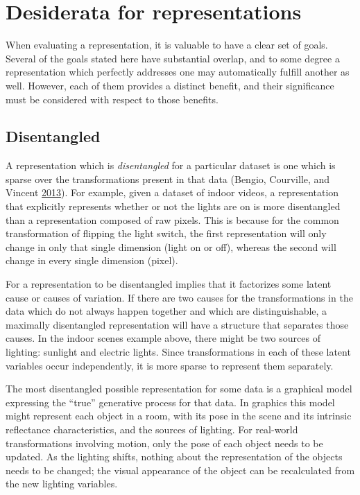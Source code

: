 \documentclass[12pt,twoside]{mitthesis}
\begin{document}
\chapter{Desiderata for
representations}\label{desiderata-for-representations}

When evaluating a representation, it is valuable to have a clear set of
goals. Several of the goals stated here have substantial overlap, and to
some degree a representation which perfectly addresses one may
automatically fulfill another as well. However, each of them provides a
distinct benefit, and their significance must be considered with respect
to those benefits.

\section{Disentangled}\label{disentangled}

A representation which is \emph{disentangled} for a particular dataset
is one which is sparse over the transformations present in that data
(Bengio, Courville, and Vincent
\protect\hyperlink{ref-bengio2013representation}{2013}). For example,
given a dataset of indoor videos, a representation that explicitly
represents whether or not the lights are on is more disentangled than a
representation composed of raw pixels. This is because for the common
transformation of flipping the light switch, the first representation
will only change in only that single dimension (light on or off),
whereas the second will change in every single dimension (pixel).

For a representation to be disentangled implies that it factorizes some
latent cause or causes of variation. If there are two causes for the
transformations in the data which do not always happen together and
which are distinguishable, a maximally disentangled representation will
have a structure that separates those causes. In the indoor scenes
example above, there might be two sources of lighting: sunlight and
electric lights. Since transformations in each of these latent variables
occur independently, it is more sparse to represent them separately.

The most disentangled possible representation for some data is a
graphical model expressing the ``true'' generative process for that
data. In graphics this model might represent each object in a room, with
its pose in the scene and its intrinsic reflectance characteristics, and
the sources of lighting. For real-world transformations involving
motion, only the pose of each object needs to be updated. As the
lighting shifts, nothing about the representation of the objects needs
to be changed; the visual appearance of the object can be recalculated
from the new lighting variables.
\end{document}
